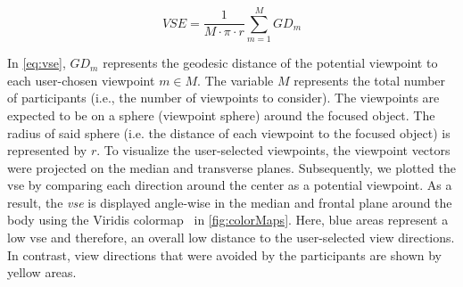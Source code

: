 \begin{equation}
	\label{eq:vse}
	VSE = \frac{1}{M \cdot \pi \cdot r}\sum_{m=1}^{M} GD_{m}
\end{equation}

In \autoref{eq:vse}, \(GD_m\) represents the geodesic distance of the potential viewpoint to each user-chosen viewpoint \(m \in M\). The variable $M$ represents the total number of participants (i.e., the number of viewpoints to consider). The viewpoints are expected to be on a sphere (viewpoint sphere) around the focused object. The radius of said sphere (i.e. the distance of each viewpoint to the focused object) is represented by $r$. To visualize the user-selected viewpoints, the viewpoint vectors were projected on the median and transverse planes. Subsequently, we plotted the \acrshort{vse} by comparing each direction around the center as a potential viewpoint. As a result, the \emph{\acrshort{vse}} is displayed angle-wise in the median and frontal plane around the body using the Viridis colormap~\cite{viridis} in \autoref{fig:colorMaps}. Here, blue areas represent a low \acrshort{vse} and therefore, an overall low distance to the user-selected view directions. In contrast, view directions that were avoided by the participants are shown by yellow areas.

